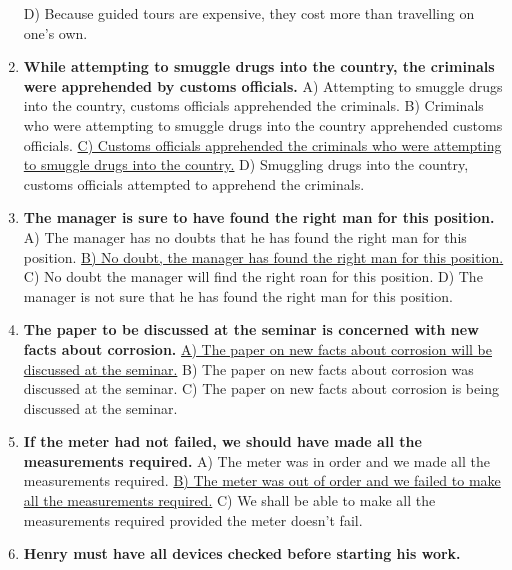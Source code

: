 \documentclass[main.tex]{subfiles}
\begin{document}
\begin{enumerate}[nosep, leftmargin=*]
		D) Because guided tours are expensive, they cost more than travelling on one's own.
	\item \textbf{While attempting to smuggle drugs into the country, the criminals were apprehended by customs officials.}\newline
		A) Attempting to smuggle drugs into the country, customs officials apprehended the criminals.\newline
		B) Criminals who were attempting to smuggle drugs into the country apprehended customs officials.\newline
		\uline{C) Customs officials apprehended the criminals who were attempting to smuggle drugs into the country.}\newline
		D) Smuggling drugs into the country, customs officials attempted to apprehend the criminals.
	\item \textbf{The manager is sure to have found the right man for this position.}\newline
		A) The manager has no doubts that he has found the right man for this position.\newline
		\uline{B) No doubt, the manager has found the right man for this position.}\newline
		C) No doubt the manager will find the right roan for this position.\newline
		D) The manager is not sure that he has found the right man for this position.
	\item \textbf{The paper to be discussed at the seminar is concerned with new facts about corrosion.}\newline
		\uline{A) The paper on new facts about corrosion will be discussed at the seminar.}\newline
		B) The paper on new facts about corrosion was discussed at the seminar.\newline
		C) The paper on new facts about corrosion is being discussed at the seminar.
	\item \textbf{If the meter had not failed, we should have made all the measurements required.}\newline
		A) The meter was in order and we made all the measurements required.\newline
		\uline{B) The meter was out of order and we failed to make all the measurements required.}\newline
		C) We shall be able to make all the measurements required provided the meter doesn't fail.
	\item \textbf{Henry must have all devices checked before starting his work.}\newline

\end{enumerate}
\end{document}
